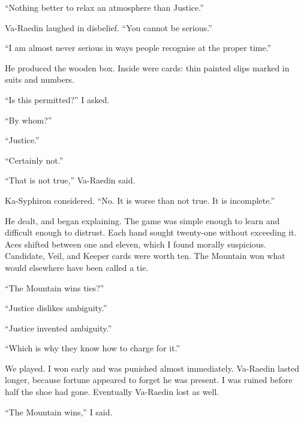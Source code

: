 ``Nothing better to relax an atmosphere than Justice.''\par

Va-Raedin laughed in disbelief. ``You cannot be serious.''\par

``I am almost never serious in ways people recognise at the proper time.''\par

He produced the wooden box. Inside were cards: thin painted slips marked in suits and numbers.\par

``Is this permitted?'' I asked.\par

``By whom?''\par

``Justice.''\par

``Certainly not.''\par

``That is not true,'' Va-Raedin said.\par

Ka-Syphiron considered. ``No. It is worse than not true. It is incomplete.''\par

He dealt, and began explaining.
The game was simple enough to learn and difficult enough to distrust. Each hand sought twenty-one without exceeding it. Aces shifted between one and eleven, which I found morally suspicious. Candidate, Veil, and Keeper cards were worth ten. The Mountain won what would elsewhere have been called a tie.\par

``The Mountain wins ties?''\par

``Justice dislikes ambiguity.''\par

``Justice invented ambiguity.''\par

``Which is why they know how to charge for it.''\par

We played. I won early and was punished almost immediately. Va-Raedin lasted longer, because fortune appeared to forget he was present.
I was ruined before half the shoe had gone. Eventually Va-Raedin lost as well.\par

``The Mountain wins,'' I said.\par

